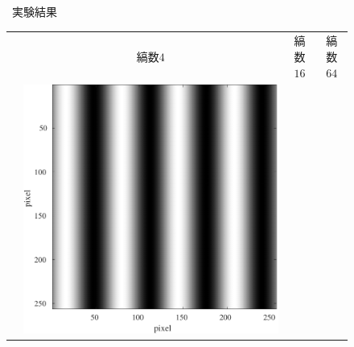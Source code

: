 \begin{figure}[H]
\begin{minipage}[b]{.23\textwidth}
    \end{minipage}
    \caption{\kadaibe\ 実験結果}
\end{figure}
\newpage
\begin{figure}[H]
    \centering
    \renewcommand{\arraystretch}{1.5}
    \begin{tabularx}{\textwidth}{p{}CCC}
                                                                                                & {\small 縞数\(4\)} & {\small 縞数\(16\)} & {\small 縞数\(64\)} \\
        \begin{minipage}{.05\textwidth}
            \centering
        \end{minipage}                                                         &
        \begin{minipage}{.25\textwidth}
            \centering
            \includegraphics[width=.9\textwidth,keepaspectratio]{../../Figures/08_11_img4.pdf}
        \end{minipage}      &
        \begin{minipage}{.25\textwidth}
            \centering

\end{minipage}
\end{tabularx}
\end{figure}
